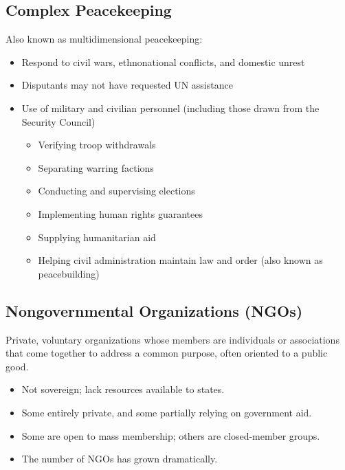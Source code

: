 \documentclass[
]{book}
\begin{document}
\hypertarget{complex-peacekeeping}{%
\subsection{Complex Peacekeeping}\label{complex-peacekeeping}}

Also known as multidimensional peacekeeping:

\begin{itemize}
\item
  Respond to civil wars, ethnonational conflicts, and domestic unrest
\item
  Disputants may not have requested UN assistance
\item
  Use of military and civilian personnel (including those drawn from the Security Council)

  \begin{itemize}
  \item
    Verifying troop withdrawals
  \item
    Separating warring factions
  \item
    Conducting and supervising elections
  \item
    Implementing human rights guarantees
  \item
    Supplying humanitarian aid
  \item
    Helping civil administration maintain law and order (also known as peacebuilding)
  \end{itemize}
\end{itemize}

\hypertarget{nongovernmental-organizations-ngos}{%
\subsection{Nongovernmental Organizations (NGOs)}\label{nongovernmental-organizations-ngos}}

Private, voluntary organizations whose members are individuals or associations that come together to address a common purpose, often oriented to a public good.

\begin{itemize}
\item
  Not sovereign; lack resources available to states.
\item
  Some entirely private, and some partially relying on government aid.
\item
  Some are open to mass membership; others are closed-member groups.
\item
  The number of NGOs has grown dramatically.
\end{itemize}
\end{document}

